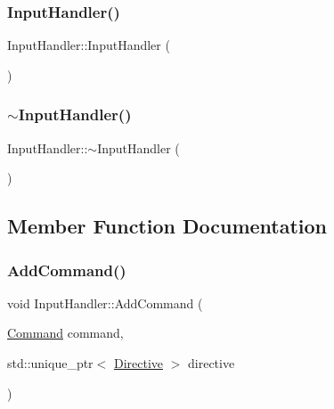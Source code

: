 \subsubsection{\texorpdfstring{InputHandler()}{InputHandler()}}
{\footnotesize\ttfamily Input\+Handler\+::\+Input\+Handler (\begin{DoxyParamCaption}{ }\end{DoxyParamCaption})}

\mbox{\label{class_input_handler_ac1f7efb54b34d433d6ffba62627452b6}} 
\subsubsection{\texorpdfstring{$\sim$InputHandler()}{~InputHandler()}}
{\footnotesize\ttfamily Input\+Handler\+::$\sim$\+Input\+Handler (\begin{DoxyParamCaption}{ }\end{DoxyParamCaption})}



\subsection{Member Function Documentation}
\mbox{\label{class_input_handler_ada312ad1f3af7ee1742f11d353185961}} 
\subsubsection{\texorpdfstring{AddCommand()}{AddCommand()}}
{\footnotesize\ttfamily void Input\+Handler\+::\+Add\+Command (\begin{DoxyParamCaption}\item[{\mbox{\hyperlink{_commands_8h_a16664d91c016c57e51eff6cbd28e32cf}{Command}}}]{command,  }\item[{std\+::unique\+\_\+ptr$<$ \mbox{\hyperlink{class_directive}{Directive}} $>$}]{directive }\end{DoxyParamCaption})}

\mbox{\label{class_input_handler_a56716403455708430c7c5e65e44cb118}} 
